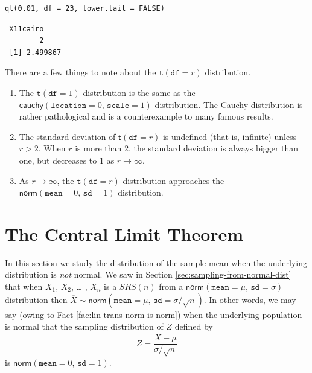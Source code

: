 \documentclass[captions=tableheading]{scrbook}
\begin{document}
\begin{verbatim}
qt(0.01, df = 23, lower.tail = FALSE)
\end{verbatim}

\begin{verbatim}
 X11cairo 
        2
 [1] 2.499867
\end{verbatim}

\begin{rem}
There are a few things to note about the \(\mathtt{t}(\mathtt{df}=r)\) distribution.
\begin{enumerate}
\item The \(\mathtt{t}(\mathtt{df}=1)\) distribution is the same as the \(\mathsf{cauchy}(\mathtt{location}=0,\,\mathtt{scale}=1)\) distribution. The Cauchy distribution is rather pathological and is a counterexample to many famous results.
\item The standard deviation of \(\mathsf{t}(\mathtt{df}=r)\) is undefined (that is, infinite) unless \(r>2\). When \(r\) is more than 2, the standard deviation is always bigger than one, but decreases to 1 as \(r\to\infty\).
\item As \(r\to\infty\), the \(\mathtt{t}(\mathtt{df}=r)\) distribution approaches the \(\mathsf{norm}(\mathtt{mean}=0,\,\mathtt{sd}=1)\) distribution.
\end{enumerate}

\end{rem}
\section{The Central Limit Theorem}
\label{sec-8-3}

\label{sec:Central-Limit-Theorem}

In this section we study the distribution of the sample mean when the underlying distribution is \emph{not} normal. We saw in Section \ref{sec:sampling-from-normal-dist} that when \(X_{1}\), \(X_{2}\), \ldots{} , \(X_{n}\) is a \(SRS(n)\) from a \(\mathsf{norm}(\mathtt{mean}=\mu,\,\mathtt{sd}=\sigma)\) distribution then \(\overline{X}\sim\mathsf{norm}(\mathtt{mean}=\mu,\,\mathtt{sd}=\sigma/\sqrt{n})\). In other words, we may say (owing to Fact \ref{fac:lin-trans-norm-is-norm}) when the underlying population is normal that the sampling distribution of \(Z\) defined by
\begin{equation}
Z=\frac{\overline{X}-\mu}{\sigma/\sqrt{n}}
\end{equation}
is \(\mathsf{norm}(\mathtt{mean}=0,\,\mathtt{sd}=1)\). 
\end{document}
